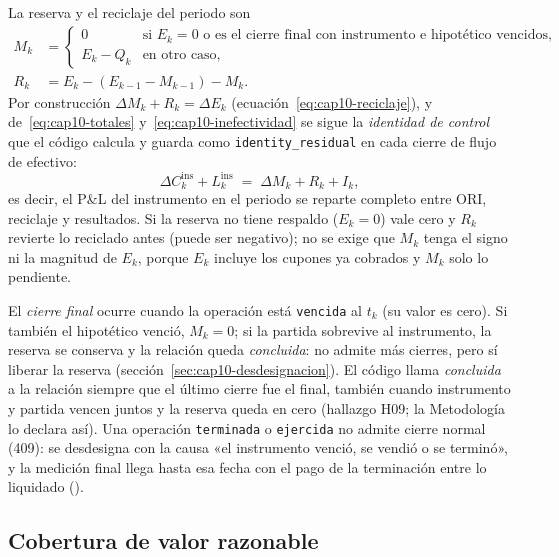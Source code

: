 La reserva y el reciclaje del periodo son
\begin{align}
  M_k &=
  \begin{cases}
    0 & \text{si } E_k = 0 \text{ o es el cierre final con instrumento e hipotético vencidos,}\\
    E_k - Q_k & \text{en otro caso,}
  \end{cases}\label{eq:cap10-reserva}\\
  R_k &= E_k - (E_{k-1} - M_{k-1}) - M_k .\label{eq:cap10-reciclaje}
\end{align}
Por construcción $\Delta M_k + R_k = \Delta E_k$ (ecuación~\eqref{eq:cap10-reciclaje}), y de~\eqref{eq:cap10-totales} y~\eqref{eq:cap10-inefectividad} se sigue la
\emph{identidad de control} que el código calcula y guarda como \texttt{identity\_residual} en cada cierre de flujo de efectivo:
\begin{equation}\label{eq:cap10-identidad}
  \Delta C^{\mathrm{ins}}_k + L^{\mathrm{ins}}_k \;=\; \Delta M_k + R_k + I_k ,
\end{equation}
es decir, el P\&L del instrumento en el periodo se reparte completo entre ORI, reciclaje y resultados. Si la reserva
no tiene respaldo ($E_k=0$) vale cero y $R_k$ revierte lo reciclado antes (puede ser negativo); no se exige que $M_k$ tenga
el signo ni la magnitud de $E_k$, porque $E_k$ incluye los cupones ya cobrados y $M_k$ solo lo pendiente.

El \emph{cierre final} ocurre cuando la operación está \texttt{vencida} al $t_k$ (su valor es cero). Si también el
hipotético venció, $M_k=0$; si la partida sobrevive al instrumento, la reserva se conserva y la relación queda
\emph{concluida}: no admite más cierres, pero sí liberar la reserva (sección~\ref{sec:cap10-desdesignacion}). El código llama
\emph{concluida} a la relación siempre que el último cierre fue el final, también cuando instrumento y partida vencen
juntos y la reserva queda en cero (hallazgo H09; la Metodología lo declara así).
Una operación \texttt{terminada} o \texttt{ejercida} no admite cierre normal (409): se desdesigna con la causa
«el instrumento venció, se vendió o se terminó», y la medición final llega hasta esa fecha con el pago de la
terminación entre lo liquidado ().

\subsection{Cobertura de valor razonable}\label{sec:cap10-vr}

